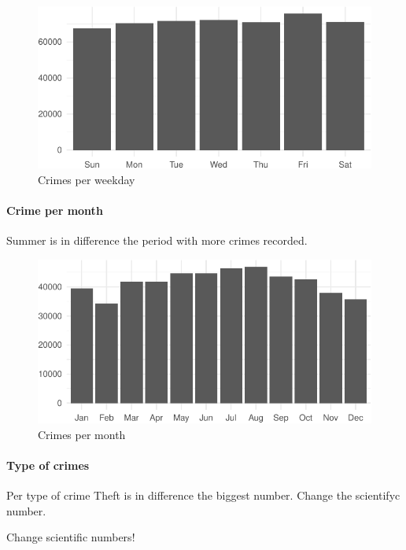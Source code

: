 \documentclass[]{article}
\let\oldparagraph\paragraph
\renewcommand{\paragraph}[1]{\oldparagraph{#1}\mbox{}}
\begin{document}
\begin{figure}[htbp]
\centering
\includegraphics{Assessment_1v6_files/figure-latex/fig4-1.pdf}
\caption{Crimes per weekday}
\end{figure}

\paragraph{Crime per month}\label{crime-per-month}

Summer is in difference the period with more crimes recorded.

\begin{figure}[htbp]
\centering
\includegraphics{Assessment_1v6_files/figure-latex/fig5-1.pdf}
\caption{Crimes per month}
\end{figure}

\paragraph{Type of crimes}\label{type-of-crimes}

Per type of crime Theft is in difference the biggest number. Change the
scientifyc number.

Change scientific numbers!
\end{document}
